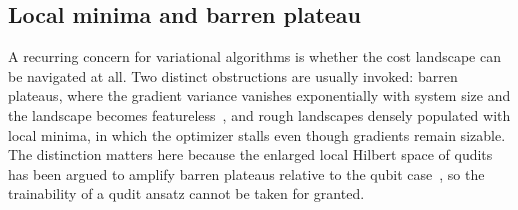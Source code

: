 %
%

\subsection{Local minima and barren plateau}

A recurring concern for variational algorithms is whether the cost landscape
can be navigated at all. Two distinct obstructions are usually invoked: barren
plateaus, where the gradient variance vanishes exponentially with system size
and the landscape becomes featureless~\cite{LaroccaNatRevPhys2025,
HolmesPRXQuantum2022}, and rough landscapes densely populated with local
minima, in which the optimizer stalls even though gradients remain sizable.
The distinction matters here because the enlarged local Hilbert space of qudits
has been argued to amplify barren plateaus relative to the qubit
case~\cite{FriedrichQMI2025}, so the trainability of a qudit ansatz cannot be
taken for granted.

